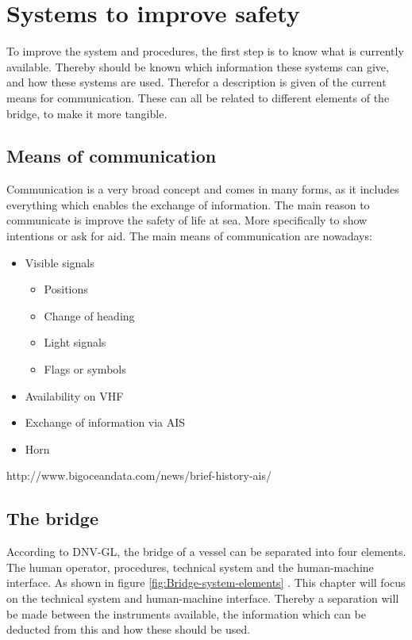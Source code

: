 \chapter{Systems to improve safety}
To improve the system and procedures, the first step is to know what is currently available. Thereby should be known which information these systems can give, and how these systems are used. Therefor a description is given of the current means for communication. These can all be related to different elements of the bridge, to make it more tangible.

\section{Means of communication}
Communication is a very broad concept and comes in many forms, as it includes everything which enables the exchange of information. The main reason to communicate is improve the safety of life at sea. More specifically to show intentions or ask for aid. The main means of communication are nowadays:

\begin{itemize}
	\item Visible signals
	\begin{itemize}
		\item Positions
		\item Change of heading
		\item Light signals
		\item Flags or symbols
	\end{itemize}
	\item Availability on \ac{VHF}
	\item Exchange of information via \ac{AIS}
	\item Horn
\end{itemize}

http://www.bigoceandata.com/news/brief-history-ais/

\section{The bridge}
According to DNV-GL, the bridge of a vessel can be separated into four elements. The human operator, procedures,
technical system and the human-machine interface. As shown in figure \ref{fig:Bridge-system-elements} \cite{DNVGL2011}. This chapter will focus on the technical system and human-machine interface. Thereby a separation will be made between the instruments available, the information which can be deducted from this and how these should be used. 

